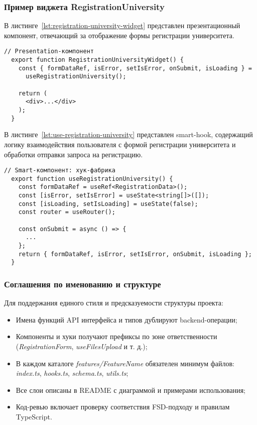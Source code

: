 \subsubsection{Пример виджета RegistrationUniversity}

В листинге~\ref{lst:registration-university-widget} представлен презентационный компонент, отвечающий за отображение формы регистрации университета.

\begin{lstlisting}[breaklines=true,caption=RegistrationUniversityWidget,label=lst:registration-university-widget]
  // Presentation-компонент
  export function RegistrationUniversityWidget() {
    const { formDataRef, isError, setIsError, onSubmit, isLoading } =
      useRegistrationUniversity();

    return (
      <div>...</div>
    );
  }
\end{lstlisting}

В листинге~\ref{lst:use-registration-university} представлен smart-hook, содержащий логику взаимодействия пользователя с формой регистрации университета и обработки отправки запроса на регистрацию.

\begin{lstlisting}[breaklines=true,caption=useRegistrationUniversity,label=lst:use-registration-university]
  // Smart-компонент: хук-фабрика
  export function useRegistrationUniversity() {
    const formDataRef = useRef<RegistrationData>();
    const [isError, setIsError] = useState<string[]>([]);
    const [isLoading, setIsLoading] = useState(false);
    const router = useRouter();

    const onSubmit = async () => {
      ...
    };
    return { formDataRef, isError, setIsError, onSubmit, isLoading };
  }
\end{lstlisting}

\subsubsection{Соглашения по именованию и структуре}

Для поддержания единого стиля и предсказуемости структуры проекта:
\begin{itemize}
  \item Имена функций API интерфейса и типов дублируют backend-операции;
  \item Компоненты и хуки получают префиксы по зоне ответственности (\textit{RegistrationForm}, \textit{useFilesUpload} и т. д.);
  \item В каждом каталоге \textit{features/FeatureName} обязателен минимум файлов: \textit{index.ts}, \textit{hooks.ts}, \textit{schema.ts}, \textit{utils.ts};
  \item Все слои описаны в README с диаграммой и примерами использования;
  \item Код-ревью включает проверку соответствия FSD-подходу и правилам TypeScript.
\end{itemize}
